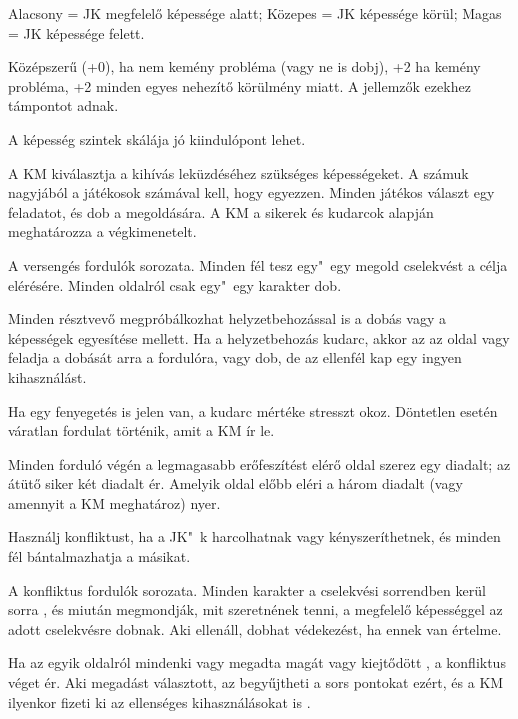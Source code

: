 \begin{multicols*}{2}

Alacsony = JK megfelelő képessége alatt; Közepes = JK képessége körül; Magas = JK képessége felett.

Középszerű (+0), ha nem kemény probléma (vagy ne is dobj), +2 ha kemény probléma, +2 minden egyes nehezítő körülmény miatt. A jellemzők ezekhez támpontot adnak.

A képesség szintek skálája jó kiindulópont lehet.

\columnbreak


A KM kiválasztja a kihívás leküzdéséhez szükséges képességeket. A számuk nagyjából a játékosok számával kell, hogy egyezzen. Minden játékos választ egy feladatot, és dob a megoldására. A KM a sikerek és kudarcok alapján meghatározza a végkimenetelt.


A versengés fordulók sorozata. Minden fél tesz egy"~egy megold cselekvést a célja elérésére. Minden oldalról csak egy"~egy karakter dob.

Minden résztvevő megpróbálkozhat helyzetbehozással is a dobás vagy a képességek egyesítése  mellett. Ha a helyzetbehozás kudarc, akkor az az oldal vagy feladja a dobását arra a fordulóra, vagy dob, de az ellenfél kap egy ingyen kihasználást.

Ha egy fenyegetés is jelen van, a kudarc mértéke stresszt okoz. Döntetlen esetén váratlan fordulat történik, amit a KM ír le.

Minden forduló végén a legmagasabb erőfeszítést elérő oldal szerez egy diadalt; az átütő siker két diadalt ér. Amelyik oldal előbb eléri a három diadalt (vagy amennyit a KM meghatároz) nyer.


Használj konfliktust, ha a JK"~k harcolhatnak vagy kényszeríthetnek, és minden fél bántalmazhatja a másikat.

A konfliktus fordulók sorozata. Minden karakter a cselekvési sorrendben kerül sorra , és miután megmondják, mit szeretnének tenni, a megfelelő képességgel az adott cselekvésre dobnak. Aki ellenáll, dobhat védekezést, ha ennek van értelme.

Ha az egyik oldalról mindenki vagy megadta magát  vagy kiejtődött , a konfliktus véget ér. Aki megadást választott, az begyűjtheti a sors pontokat ezért, és a KM ilyenkor fizeti ki az ellenséges kihasználásokat is .


\end{multicols*}

